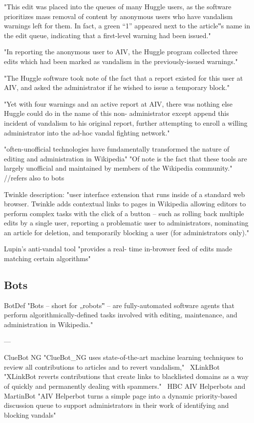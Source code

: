 "This edit was placed into the queues of many
Huggle users, as the software prioritizes mass removal of
content by anonymous users who have vandalism warnings
left for them. In fact, a green “1” appeared next to the
article‟s name in the edit queue, indicating that a first-level
warning had been issued."

"In reporting the anonymous user to
AIV, the Huggle program collected three edits which had been
marked as vandalism in the previously-issued warnings."

"The Huggle software took note of the
fact that a report existed for this user at AIV, and asked the
administrator if he wished to issue a temporary block."

"Yet with four warnings and an active report at AIV, there was
nothing else Huggle could do in the name of this non-
administrator except append this incident of vandalism to his
original report, further attempting to enroll a willing
administrator into the ad-hoc vandal fighting network."

\cite{GeiRib2010}
"often-unofficial technologies have fundamentally
transformed the nature of editing and administration in
Wikipedia"
"Of note is the fact that these tools are largely
unofficial and maintained by members of the Wikipedia
community."
//refers also to bots

\cite{GeiRib2010}
Twinkle description:
"user interface extension that runs inside
of a standard web browser. Twinkle adds contextual links to
pages in Wikipedia allowing editors to perform complex tasks
with the click of a button – such as rolling back multiple edits
by a single user, reporting a problematic user to
administrators, nominating an article for deletion, and
temporarily blocking a user (for administrators only)."

Lupin's anti-vandal tool
"provides a real-
time in-browser feed of edits made matching certain
algorithms"

\subsection{Bots}

\cite{GeiRib2010}
BotDef
"Bots – short for „robots‟ – are fully-automated software
agents that perform algorithmically-defined tasks involved
with editing, maintenance, and administration in Wikipedia."

---

ClueBot NG
"ClueBot_NG uses state-of-the-art machine learning techniques to review all contributions to
articles and to revert vandalism,"~\cite{HalRied2012}
XLinkBot
"XLinkBot reverts contributions that create links to
blacklisted domains as a way of quickly and permanently dealing with spammers."~\cite{HalRied2012}
HBC AIV Helperbots and MartinBot
"AIV Helperbot turns a simple page into a dynamic
priority-based discussion queue to support administrators in their work of identifying and
blocking vandals"~\cite{HalRied2012}

